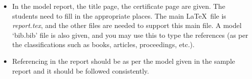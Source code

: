 \documentclass[12pt, a4paper]{article}
\begin{document}
\begin{itemize}
\item In the model report, the title page, the certificate page
  are given.  The students need to fill in the appropriate places.
  The main \LaTeX  ~file is {\it report.tex}, and the other files are
  needed to support this main file.  A model `bib.bib' file is also
  given, and you may use this to type the references (as per the
  classifications such as books, articles, proceedings, etc.).

\item Referencing in the report should be as per the model given in the sample
  report and it should be followed consistently.


\end{itemize}
\end{document}
